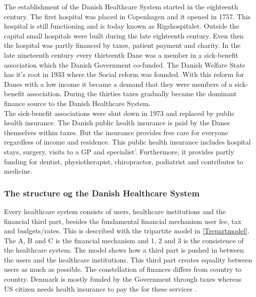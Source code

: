 The establishment of the Danish Healthcare System started in the eighteenth century. The first hospital was placed in Copenhagen and it opened in 1757. This hospital is still functioning and is today known as Rigshospitalet. Outside the capital small hospitals were built during the late eighteenth century. Even then the hospital was partly financed by taxes, patient payment and charity. In the late nineteenth century every thirteenth Dane was a member in a sick-benefit association which the Danish Government co-funded. The Danish Welfare State has it's root in 1933 where the Social reform was founded. With this reform for Danes with a low income it became a demand that they were members of a sick-benefit association. During the thirties taxes gradually became the dominant finance source to the Danish Healthcare System.\\ 
The sick-benefit associations were shut down in 1973 and replaced by public health insurance. The Danish public health insurance is paid by the Danes themselves within taxes. But the insurance provides free care for everyone regardless of income and residence. This public health insurance includes hospital stays, surgery, visits to a GP and specialist'. Furthermore, it provides partly funding for dentist, physiotherapist, chiropractor, podiatrist and contributes to medicine.   \\

\subsubsection{The structure og the Danish Healthcare System}
Every healthcare system consists of users, healthcare institutions and the financial third part, besides the fundamental financial mechanism user fee, tax and budgets/rates. This is described with the tripartite model in \cref{Trepartmodel}. The A, B and C is the financial mechanism and 1, 2 and 3 is the consistence of the healthcare system. The model shows how a third part is pushed in between the users and the healthcare institutions. This third part creates equality between users as much as possible. The constellation of finances differs from country to country. Denmark is mostly funded by the Government through taxes whereas US citizen needs health insurance to pay the for these services \cite{sundhedsvaesen}. \\


